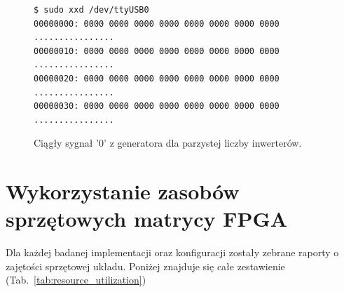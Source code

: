 \begin{figure}[H]
    \centering
    \begin{verbatim}
$ sudo xxd /dev/ttyUSB0
00000000: 0000 0000 0000 0000 0000 0000 0000 0000  ................
00000010: 0000 0000 0000 0000 0000 0000 0000 0000  ................
00000020: 0000 0000 0000 0000 0000 0000 0000 0000  ................
00000030: 0000 0000 0000 0000 0000 0000 0000 0000  ................
    \end{verbatim}
    \caption{Ciągły sygnał '0' z generatora dla parzystej liczby inwerterów.}
    \label{fig:ch3_even_inverter_num_zeros}
\end{figure}




\section{Wykorzystanie zasobów sprzętowych matrycy FPGA}

Dla każdej  badanej implementacji oraz konfiguracji zostały zebrane 
raporty o zajętości sprzętowej układu. Poniżej znajduje się całe zestawienie 
(Tab.~\ref{tab:resource_utilization})

